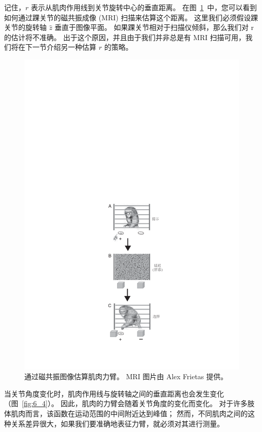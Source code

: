 记住，$r$ 表示从肌肉作用线到关节旋转中心的垂直距离。
在图~\ref{fig:6_3}~中，您可以看到如何通过踝关节的磁共振成像 (MRI) 扫描来估算这个距离。
这里我们必须假设踝关节的旋转轴 $\hat{z}$ 垂直于图像平面。
如果踝关节相对于扫描仪倾斜，那么我们对 r 的估计将不准确。
出于这个原因，并且由于我们并非总是有 MRI 扫描可用，我们将在下一节介绍另一种估算 $r$ 的策略。


\begin{figure}[!htb]
	\centering
	\includegraphics[width=0.4\linewidth]{chap6/6_3}
	\caption{通过磁共振图像估算肌肉力臂。
		MRI 图片由 Alex Frietas 提供。 \label{fig:6_3}}
\end{figure}


当关节角度变化时，肌肉作用线与旋转轴之间的垂直距离也会发生变化（图~\ref{fig:6_4}）。
因此，肌肉的力臂会随着关节角度的变化而变化。
对于许多肢体肌肉而言，该函数在运动范围的中间附近达到峰值；
然而，不同肌肉之间的这种关系差异很大，如果我们要准确地表征力臂，就必须对其进行测量。


